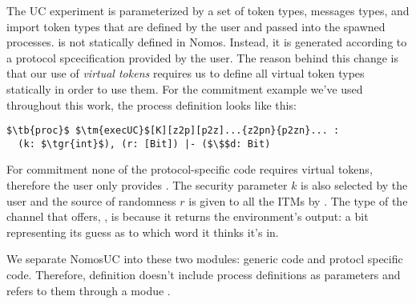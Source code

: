The UC experiment is parameterized by a set of token types, messages types, and import token types that are defined by the user and passed into the spawned processes. 
 is not statically defined in Nomos. Instead, it is generated according to a protocol spcecification provided by the user.
The reason behind this change is that our use of \textit{virtual tokens} requires us to define all virtual token types statically in order to use them.
For the commitment example we've used throughout this work, the  process definition looks like this:
\begin{lstlisting}[basicstyle=\small\BeraMonottFamily, frame=single, mathescape, caption={The process definition of the \msf{execUC} function.}]
$\tb{proc}$ $\tm{execUC}$[K][z2p][p2z]...{z2pn}{p2zn}... :
  (k: $\tgr{int}$), (r: [Bit]) |- ($\$$d: Bit)
\end{lstlisting}
For commitment none of the protocol-specific code requires virtual tokens, therefore the user only provides \inline{[K]}. 
The security parameter $k$ is also selected by the user and the source of randomness $r$ is given to all the ITMs by .
The type of the channel that  offers, , is  because it returns the environment's output: a bit representing its guess as to which word it thinks it's in.

%

We separate NomosUC into these two modules: generic code and protocl specific code. 
Therefore,  definition doesn't include process definitions as parameters and refers to them through a modue .

